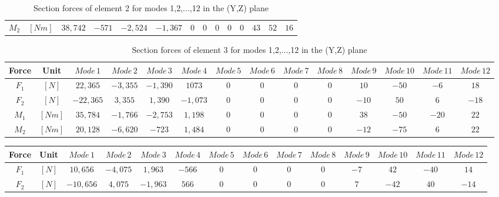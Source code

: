 \documentclass[11pt,a4paper,titlepage]{report}
\begin{document}
\begin{appendix}
\begin{landscape}
\begin{table}[]
\begin{tiny}
\begin{tabular}{c|c|c|c|c|c|c|c|c|c|c|c|c|c}
        $M_2$ & $[Nm]$ & $38,742$ &  $-571$  & $-2,524$  & $-1,367$ &  $0$  & $0$ &   $0$ &  $0$  & $0$ & $43$  &  $52$  &  $16$\\
        \end{tabular}
        \end{tiny}
    \caption{Section forces of element 2 for modes 1,2,...,12 in the (Y,Z) plane}
    \label{tab:my_label}
\end{table}
\begin{table}[]
    \centering
    \begin{tiny}
    \begin{tabular}{c|c|c|c|c|c|c|c|c|c|c|c|c|c}
    Force & Unit & $Mode\,1$ & $Mode\,2$ & $Mode\,3$ & $Mode\,4$ & $Mode\,5$ & $Mode\,6$ & $Mode\,7$ & $Mode\,8$ & $Mode\,9$ & $Mode\,10$ & $Mode\,11$ & $Mode\,12$\\
    \hline
    $F_1$ & $[N]$ & $22,365$ &  $-3,355$  & $-1,390$   & $1073$  &  $0$  & $0$ & $0$ &  $0$    & $10$ &  $-50$  & $-6$ & $18$\\
    $F_2$ & $[N]$ &  $-22,365$  &  $3,355$ &   $1,390$  & $-1,073$  & $0$ &  $0$ &  $0$  &  $0$ &  $-10$  &  $50$ &  $6$ &  $-18$\\
    $M_1$ & $[Nm]$ & $35,784$ &  $-1,766$ &  $-2,753$ &   $1,198$  &  $0$ &  $0$ & $0$ & $0$    & $38$ &  $-50$ &  $-20$  &  $22$\\
    $M_2$ & $[Nm]$ & $20,128$ &  $-6,620$ &  $-723$  &  $1,484$ & $0$  & $0$ & $0$ & $0$ &  $-12$ &  $-75$  &  $6$ &  $22$\\
        \end{tabular}
        \end{tiny}
    \caption{Section forces of element 3 for modes 1,2,...,12 in the (Y,Z) plane}
    \label{tab:my_label}
\end{table}
\begin{table}[]
    \centering
    \begin{tiny}
    \begin{tabular}{c|c|c|c|c|c|c|c|c|c|c|c|c|c}
    Force & Unit & $Mode\,1$ & $Mode\,2$ & $Mode\,3$ & $Mode\,4$ & $Mode\,5$ & $Mode\,6$ & $Mode\,7$ & $Mode\,8$ & $Mode\,9$ & $Mode\,10$ & $Mode\,11$ & $Mode\,12$\\
    \hline
    $F_1$ & $[N]$ & $10,656$ &  $-4,075$ &    $1,963$ &  $-566$ &  $0$ & $0$ & $0$ & $0$ &  $-7$ &  $42$ &  $-40$  &  $14$\\
    $F_2$ & $[N]$ &  $-10,656$ &  $4,075$ &  $-1,963$ &   $566$ &  $0$ & $0$ & $0$ & $0$    & $7$ &  $-42$ &  $40$ &  $-14$\\

\end{tabular}
\end{tiny}
\end{table}
\end{landscape}
\end{appendix}
\end{document}
